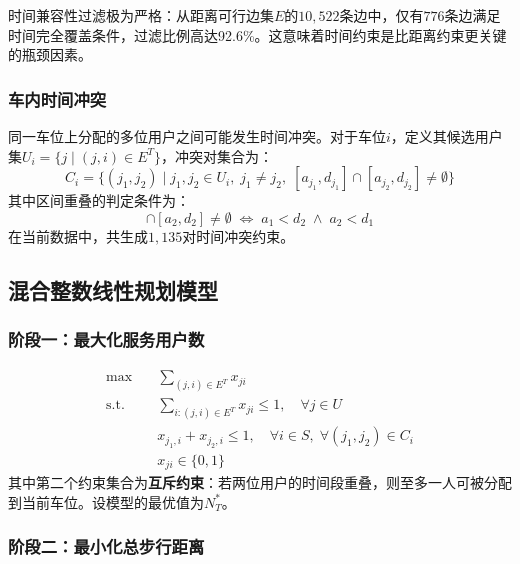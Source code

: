 \documentclass[12pt,a4paper]{ctexart}
\begin{document}
时间兼容性过滤极为严格：从距离可行边集$E$的$10{,}522$条边中，仅有$776$条边满足时间完全覆盖条件，过滤比例高达92.6\%。这意味着时间约束是比距离约束更关键的瓶颈因素。

\subsubsection{车内时间冲突}

同一车位上分配的多位用户之间可能发生时间冲突。对于车位$i$，定义其候选用户集$U_i = \{j \mid (j,i) \in E^T\}$，冲突对集合为：
\begin{equation}
  C_i = \{(j_1, j_2) \mid j_1, j_2 \in U_i,\; j_1 \neq j_2,\; [a_{j_1}, d_{j_1}] \cap [a_{j_2}, d_{j_2}] \neq \emptyset\}
\end{equation}
其中区间重叠的判定条件为：
\begin{equation}
  [a_1, d_1] \cap [a_2, d_2] \neq \emptyset \;\Longleftrightarrow\; a_1 < d_2 \;\wedge\; a_2 < d_1
\end{equation}
在当前数据中，共生成$1{,}135$对时间冲突约束。

\subsection{混合整数线性规划模型}

\subsubsection{阶段一：最大化服务用户数}

\begin{equation}\label{eq:q2s1}
  \begin{aligned}
    \max \quad & \sum_{(j,i) \in E^T} x_{ji} \\
    \text{s.t.} \quad & \sum_{i: (j,i) \in E^T} x_{ji} \leq 1, \quad \forall j \in U \\
    & x_{j_1, i} + x_{j_2, i} \leq 1, \quad \forall i \in S,\; \forall (j_1, j_2) \in C_i \\
    & x_{ji} \in \{0, 1\}
  \end{aligned}
\end{equation}
其中第二个约束集合为\textbf{互斥约束}：若两位用户的时间段重叠，则至多一人可被分配到当前车位。设模型的最优值为$N^*_T$。

\subsubsection{阶段二：最小化总步行距离}
\end{document}
